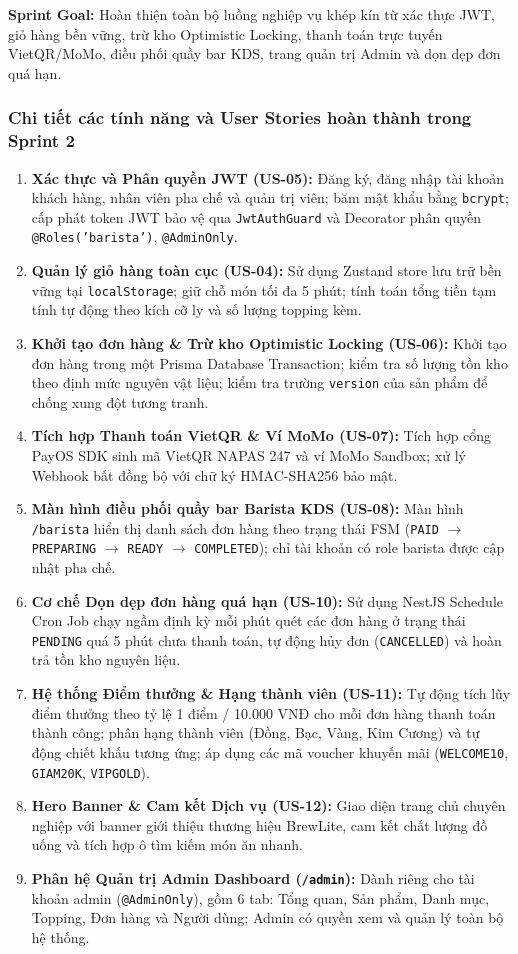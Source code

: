 \documentclass[11pt,a4paper]{article}
\begin{document}
\textbf{Sprint Goal:} Hoàn thiện toàn bộ luồng nghiệp vụ khép kín từ xác thực JWT, giỏ hàng bền vững, trừ kho Optimistic Locking, thanh toán trực tuyến VietQR/MoMo, điều phối quầy bar KDS, trang quản trị Admin và dọn dẹp đơn quá hạn.

\subsubsection{Chi tiết các tính năng và User Stories hoàn thành trong Sprint 2}
\begin{enumerate}[leftmargin=*]
    \item \textbf{Xác thực và Phân quyền JWT (US-05):} Đăng ký, đăng nhập tài khoản khách hàng, nhân viên pha chế và quản trị viên; băm mật khẩu bằng \texttt{bcrypt}; cấp phát token JWT bảo vệ qua \texttt{JwtAuthGuard} và Decorator phân quyền \texttt{@Roles('barista')}, \texttt{@AdminOnly}.
    \item \textbf{Quản lý giỏ hàng toàn cục (US-04):} Sử dụng Zustand store lưu trữ bền vững tại \texttt{localStorage}; giữ chỗ món tối đa 5 phút; tính toán tổng tiền tạm tính tự động theo kích cỡ ly và số lượng topping kèm.
    \item \textbf{Khởi tạo đơn hàng \& Trừ kho Optimistic Locking (US-06):} Khởi tạo đơn hàng trong một Prisma Database Transaction; kiểm tra số lượng tồn kho theo định mức nguyên vật liệu; kiểm tra trường \texttt{version} của sản phẩm để chống xung đột tương tranh.
    \item \textbf{Tích hợp Thanh toán VietQR \& Ví MoMo (US-07):} Tích hợp cổng PayOS SDK sinh mã VietQR NAPAS 247 và ví MoMo Sandbox; xử lý Webhook bất đồng bộ với chữ ký HMAC-SHA256 bảo mật.
    \item \textbf{Màn hình điều phối quầy bar Barista KDS (US-08):} Màn hình \texttt{/barista} hiển thị danh sách đơn hàng theo trạng thái FSM (\texttt{PAID} $\rightarrow$ \texttt{PREPARING} $\rightarrow$ \texttt{READY} $\rightarrow$ \texttt{COMPLETED}); chỉ tài khoản có role barista được cập nhật pha chế.
    \item \textbf{Cơ chế Dọn dẹp đơn hàng quá hạn (US-10):} Sử dụng NestJS Schedule Cron Job chạy ngầm định kỳ mỗi phút quét các đơn hàng ở trạng thái \texttt{PENDING} quá 5 phút chưa thanh toán, tự động hủy đơn (\texttt{CANCELLED}) và hoàn trả tồn kho nguyên liệu.
    \item \textbf{Hệ thống Điểm thưởng \& Hạng thành viên (US-11):} Tự động tích lũy điểm thưởng theo tỷ lệ 1 điểm / 10.000 VNĐ cho mỗi đơn hàng thanh toán thành công; phân hạng thành viên (Đồng, Bạc, Vàng, Kim Cương) và tự động chiết khấu tương ứng; áp dụng các mã voucher khuyến mãi (\texttt{WELCOME10}, \texttt{GIAM20K}, \texttt{VIPGOLD}).
    \item \textbf{Hero Banner \& Cam kết Dịch vụ (US-12):} Giao diện trang chủ chuyên nghiệp với banner giới thiệu thương hiệu BrewLite, cam kết chất lượng đồ uống và tích hợp ô tìm kiếm món ăn nhanh.
    \item \textbf{Phân hệ Quản trị Admin Dashboard (\texttt{/admin}):} Dành riêng cho tài khoản admin (\texttt{@AdminOnly}), gồm 6 tab: Tổng quan, Sản phẩm, Danh mục, Topping, Đơn hàng và Người dùng; Admin có quyền xem và quản lý toàn bộ hệ thống.
\end{enumerate}
\clearpage
\end{document}
